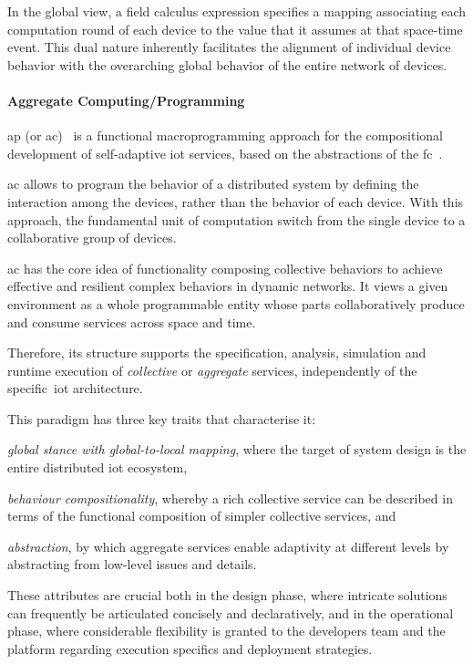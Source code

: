 \documentclass[12pt, a4paper]{article}
\newenvironment{inlinelist}{\begin{enumerate*}[label=\emph{(\roman*)}]}{\end{enumerate*}}
\begin{document}
In the global view,
a field calculus expression specifies a mapping associating each computation round of each device to the value that it assumes at that space-time event.
%
This dual nature inherently facilitates the alignment of individual device behavior with the overarching global behavior of the entire
network of devices.

\paragraph{Aggregate Computing/Programming}
\ac{ap} (or \ac{ac})~\cite{CASADEI2019252} is a functional macroprogramming approach for the compositional development of self-adaptive \ac{iot} services,
based on the abstractions of the \ac{fc}~\cite{MAMEIZL04}.

\ac{ac} allows to program the behavior of a distributed system by defining the interaction among the devices,
rather than the behavior of each device.
%
With this approach,
the fundamental unit of computation switch from the single device to a collaborative group of devices.

\ac{ac} has the core idea of functionality composing collective behaviors to achieve effective and resilient complex behaviors in dynamic networks. %
%
It views a given environment as a whole programmable entity whose parts collaboratively produce and consume services across space and time.

Therefore, its structure supports the specification, analysis, simulation and runtime execution of \emph{collective}
or \emph{aggregate} services, independently of the specific~\ac{iot} architecture.

This paradigm has three key traits that characterise it:
\begin{inlinelist}
    \item \emph{global stance with global-to-local mapping}, where the target of system design is the entire distributed \ac{iot} ecosystem,
    \item \emph{behaviour compositionality}, whereby a rich collective service can be described in terms of the functional
        composition of simpler collective services, and
    \item \emph{abstraction}, by which aggregate services enable adaptivity at different levels by abstracting from low-level
        issues and details.
\end{inlinelist}
%
These attributes are crucial both in the design phase, where intricate solutions can frequently be articulated concisely
and declaratively, and in the operational phase, where considerable flexibility is granted to the developers team and the
platform regarding execution specifics and deployment strategies.
\end{document}
